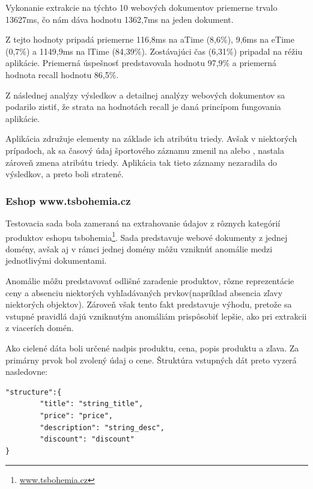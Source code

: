 Vykonanie extrakcie na týchto 10 webových dokumentov priemerne trvalo 13627ms, čo nám dáva hodnotu 1362,7ms na jeden dokument. 

Z tejto hodnoty pripadá priemerne 116,8ms na aTime (8,6\%), 9,6ms na eTime (0,7\%) a 1149,9ms na lTime (84,39\%). Zostávajúci čas (6,31\%) pripadal na réžiu aplikácie. Priemerná úspešnosť predstavovala hodnotu 97,9\% a priemerná hodnota recall hodnotu 86,5\%. 

\bigskip

Z následnej analýzy výsledkov a detailnej analýzy webových dokumentov sa podarilo zistiť, že strata na hodnotách recall je daná princípom fungovania aplikácie.

Aplikácia združuje elementy na základe ich atribútu triedy. Avšak v niektorých prípadoch, ak sa časový údaj športového záznamu zmenil na  alebo ,  nastala zároveň zmena atribútu triedy. Aplikácia tak tieto záznamy nezaradila do výsledkov, a preto boli stratené.

\newpage

\subsubsection{Eshop www.tsbohemia.cz}

Testovacia sada bola zameraná na extrahovanie údajov z rôznych kategórií produktov eshopu tsbohemia\footnote{\url{www.tsbohemia.cz}}. Sada predstavuje webové dokumenty z jednej domény, avšak aj v rámci jednej domény môžu vzniknúť anomálie medzi jednotlivými dokumentami.

Anomálie môžu predstavovať odlišné zaradenie produktov, rôzne reprezentácie ceny a absenciu niektorých vyhľadávaných prvkov(napríklad absencia zľavy niektorých objektov). Zároveň však tento fakt predstavuje výhodu, pretože sa vstupné pravidlá dajú vzniknutým anomáliám prispôsobiť lepšie, ako pri extrakcii z viacerích domén.

\bigskip

Ako cielené dáta boli určené nadpis produktu, cena, popis produktu a zľava. Za primárny prvok bol zvolený údaj o cene. Štruktúra vstupných dát preto vyzerá nasledovne:

\bigskip

\begin{lstlisting}
"structure":{
        "title": "string_title",
        "price": "price",
        "description": "string_desc",
        "discount": "discount"
}
\end{lstlisting}

